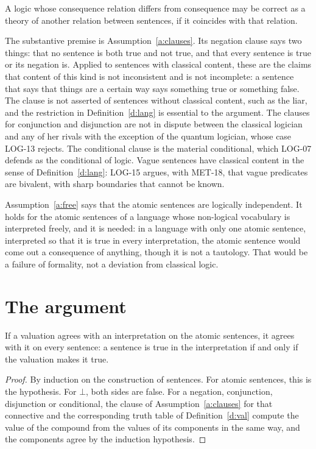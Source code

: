 \documentclass{situationist-preprint}
\begin{document}
\begin{principle}\label{p:other}
A logic whose consequence relation differs from consequence may be correct as a theory of another relation between sentences, if it coincides with that relation.
\end{principle}

The substantive premise is Assumption~\ref{a:clauses}. Its negation clause says two things: that no sentence is both true and not true, and that every sentence is true or its negation is. Applied to sentences with classical content, these are the claims that content of this kind is not inconsistent and is not incomplete: a sentence that says that things are a certain way says something true or something false. The clause is not asserted of sentences without classical content, such as the liar, and the restriction in Definition~\ref{d:lang} is essential to the argument. The clauses for conjunction and disjunction are not in dispute between the classical logician and any of her rivals with the exception of the quantum logician, whose case LOG-13 rejects. The conditional clause is the material conditional, which LOG-07 defends as the conditional of logic. Vague sentences have classical content in the sense of Definition~\ref{d:lang}: LOG-15 argues, with MET-18, that vague predicates are bivalent, with sharp boundaries that cannot be known.

Assumption~\ref{a:free} says that the atomic sentences are logically independent. It holds for the atomic sentences of a language whose non-logical vocabulary is interpreted freely, and it is needed: in a language with only one atomic sentence, interpreted so that it is true in every interpretation, the atomic sentence would come out a consequence of anything, though it is not a tautology. That would be a failure of formality, not a deviation from classical logic.

\section{The argument}\label{s:argument}

\begin{lemma}\label{l:truth}
If a valuation agrees with an interpretation on the atomic sentences, it agrees with it on every sentence: a sentence is true in the interpretation if and only if the valuation makes it true.
\end{lemma}

\begin{proof}
By induction on the construction of sentences. For atomic sentences, this is the hypothesis. For $\bot$, both sides are false. For a negation, conjunction, disjunction or conditional, the clause of Assumption~\ref{a:clauses} for that connective and the corresponding truth table of Definition~\ref{d:val} compute the value of the compound from the values of its components in the same way, and the components agree by the induction hypothesis.
\end{proof}
\end{document}
